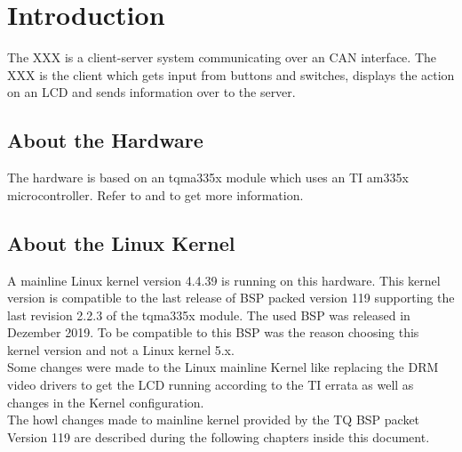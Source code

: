 \chapter{Introduction} \label{chp:einleitung}

The XXX is a client-server system communicating over an CAN interface. The XXX
is the client which gets input from buttons and switches, displays the action
on an LCD and sends information over to the server.

\section{About the Hardware}%
\label{sec:About the Hardware}

The hardware is based on an tqma335x module which uses an TI am335x
microcontroller. Refer to \cite[TQ product website]{tqam335x} and
\cite[TI am335x manual]{tiam335x} to get more information.


\section{About the Linux Kernel}%
\label{sec:About the Linux Kernel}

A mainline Linux kernel version 4.4.39 is running on this hardware. This kernel
version is compatible to the last release of BSP packed version 119 supporting
the last revision 2.2.3 of the tqma335x module. The used \ac{BSP} was released
in Dezember 2019. To be compatible to this BSP was the reason choosing this
kernel version and not a Linux kernel 5.x.
\\
Some changes were made to the Linux mainline Kernel like replacing the DRM video
drivers to get the LCD running according to the TI errata \cite{am335_errata} as
well as changes in the Kernel configuration.
\\
The howl changes made to mainline kernel provided by the TQ BSP packet Version
119 \cite{tq_bsp119} are described during the following chapters inside this
document.
